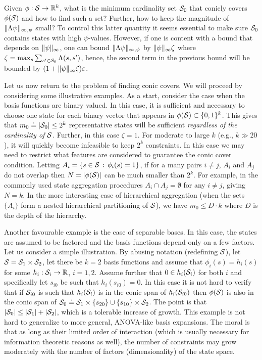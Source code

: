 \documentclass[12pt,draftcls,onecolumn]{IEEEtran}
\begin{document}
Given $\phi:\S \to \Re^k$, what is the minimum cardinality set $\S_0$ that 
conicly covers $\phi(\S)$ and how to find such a set? Further, how to keep the magnitude of $\norm{\Lambda \psi}_{\infty,\psi}$ small? To control this latter quantity it seems essential to make sure $\S_0$ contains states with high $\psi$-values. 
However, if one is content with a bound that depends on $\norm{\psi}_{\infty}$, one can bound 
$\norm{\Lambda \psi}_{\infty,\psi}$ by $\norm{\psi}_{\infty} \zeta$ where $\zeta = \max_s \sum_{s'\in \S_0} \Lambda(s,s')$,
hence, the second term in the previous bound will be bounded by $(1+\norm{\psi}_{\infty} \zeta) \eps$.

Let us now return to the problem of finding conic covers. 
We will proceed by considering some illustrative examples. 
As a start, consider the case when the basis functions are binary valued.
In this case, it is sufficient and necessary to choose one state for each binary vector 
that appears in $\phi(\S)\subset \{0,1\}^k$.
This gives that $m_0 \doteq |\S_0|\le 2^k$ representative states will be sufficient \emph{regardless of the cardinality of $\S$}.
Further, in this case $\zeta = 1$.
For moderate to large $k$ (e.g., $k\gg 20$), it will quickly become infeasible to keep $2^k$ constraints.
In this case we may need to restrict what features are considered to guarantee the conic cover condition.
Letting $A_i = \{s\in \S\,:\, \phi_i(s)=1 \}$, if for a many pairs $i\ne j$, $A_i$ and $A_j$ do not overlap 
then $N = |\phi(\S)|$ can be much smaller than $2^k$. 
For example, in the commonly used state aggregation procedures 
$A_i \cap A_j = \emptyset$ for any $i\ne j$, giving $N=k$. 
In the more interesting case of 
hierarchical aggregation (when the sets $\{A_i\}$ form a nested hierarchical partitioning of $\S$), 
we have $m_0 \le D \cdot k$ where $D$ is the depth of the hierarchy.

Another favourable example is the case of separable bases.
In this case, the states are assumed to be factored 
and the basis functions depend only on a few factors.
Let us consider a simple illustration.
By abusing notation (redefining $\S$), let $\S = \S_1 \times \S_2$, 
let there be $k=2$ basis functions and assume that $\phi_i(s) = h_i(s)$ for some $h_i:\S_i \to \Re$, $i=1,2$.
Assume further that $0\in h_i(\S_i)$ for both $i$ and specifically let $s_{i0}$ be such that $h_i(s_{i0})=0$.
In this case it is not hard to verify that if $\S_{i0}$ is such that $h_i(\S_i)$ is in the conic span of $h_i(\S_{i0})$ then
$\phi(\S)$ is also in the conic span of $\S_0 \doteq \S_1 \times \{ s_{20} \} \cup \{ s_{10} \} \times \S_2$.
The point is that $|\S_0| \le |\S_1| + |\S_2|$, which is a tolerable increase of growth.
This example is not hard to generalize to more general, ANOVA-like basis expansions. The moral
is that as long as their limited order of interaction (which is usually necessary for information theoretic reasons as well),
the number of constraints may grow moderately with the number of factors (dimensionality) of the state space.
\end{document}
